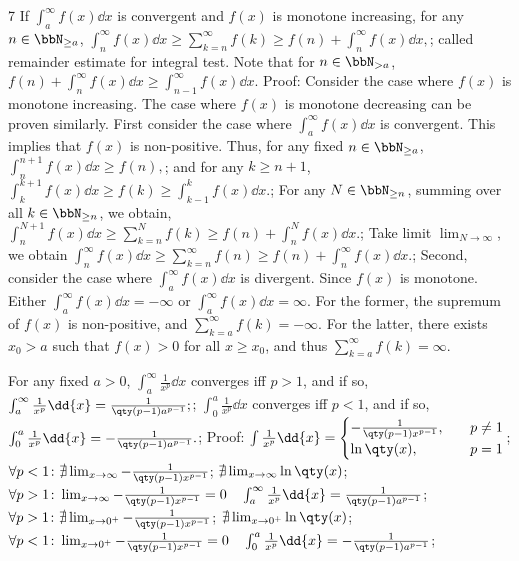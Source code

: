 \documentclass[a4paper,10pt]{extarticle}
\begin{document}
\begin{multicols}{7}
If $\int_a^{\infty}f(x)\dd{x}$ is convergent and $f(x)$ is monotone increasing, for any $n\in\bbN_{\ge a}$,
\(\int_n^{\infty}f(x)\dd{x}\ge\sum_{k=n}^{\infty}f(k)\ge f(n)+\int_n^{\infty}f(x)\dd{x},\); 
called remainder estimate for integral test. Note that for $n\in\bbN_{>a}$, $f(n)+\int_n^{\infty}f(x)\dd{x}\ge\int_{n-1}^{\infty}f(x)\dd{x}$.
Proof:
Consider the case where $f(x)$ is monotone increasing. The case where $f(x)$ is monotone decreasing can be proven similarly. First consider the case where $\int_a^{\infty}f(x)\dd{x}$ is convergent. This implies that $f(x)$ is non-positive. Thus, for any fixed $n\in\bbN_{\ge a}$,
\(\int_n^{n+1}f(x)\dd{x}\ge f(n),\); 
and for any $k\geq n+1$,
\(\int_k^{k+1}f(x)\dd{x}\ge f(k)\ge\int_{k-1}^kf(x)\dd{x}.\); 
For any $N\in\bbN_{\ge n}$, summing over all $k\in\bbN_{\ge n}$, we obtain, 
\(\int_n^{N+1}f(x)\dd{x}\ge\sum_{k=n}^Nf(k)\ge f(n)+\int_n^Nf(x)\dd{x}.\); 
Take limit $\lim_{N\to\infty}$, we obtain
\(\int_n^{\infty}f(x)\dd{x}\ge\sum_{k=n}^{\infty}f(n)\ge f(n)+\int_n^{\infty}f(x)\dd{x}.\); 
Second, consider the case where $\int_a^{\infty}f(x)\dd{x}$ is divergent. Since $f(x)$ is monotone. Either $\int_a^{\infty}f(x)\dd{x}=-\infty$ or $\int_a^{\infty}f(x)\dd{x}=\infty$. For the former, the supremum of $f(x)$ is non-positive, and $\sum_{k=a}^{\infty}f(k)=-\infty$. For the latter, there exists $x_0>a$ such that $f(x)>0$ for all $x\ge x_0$, and thus $\sum_{k=a}^{\infty}f(k)=\infty$.



For any fixed $a>0$, $\int_a^{\infty}\frac{1}{x^p}\dd{x}$ converges iff $p>1$, and if so,
\(\int_a^{\infty}\frac{1}{x^p}\dd{x}=\frac{1}{\qty(p-1)a^{p-1}};\); 
$\int_0^a\frac{1}{x^p}\dd{x}$ converges iff $p<1$, and if so,
\(\int_0^a\frac{1}{x^p}\dd{x}=-\frac{1}{\qty(p-1)a^{p-1}}.\); 
Proof:
\(\int\frac{1}{x^p}\dd{x}=\begin{cases}
-\frac{1}{\qty(p-1)x^{p-1}},\quad&p\neq 1\\
\ln\qty(x),\quad&p=1
\end{cases}\); 
\(\forall p<1\colon\nexists\lim_{x\to\infty}-\frac{1}{\qty(p-1)x^{p-1}}\); 
\(\nexists\lim_{x\to\infty}\ln\qty(x)\); 
\(\forall p>1\colon\lim_{x\to\infty}-\frac{1}{\qty(p-1)x^{p-1}}=0\quad\int_a^{\infty}\frac{1}{x^p}\dd{x}=\frac{1}{\qty(p-1)a^{p-1}}\); 
\(\forall p>1\colon\nexists\lim_{x\to 0^+}-\frac{1}{\qty(p-1)x^{p-1}}\); 
\(\nexists\lim_{x\to 0^+}\ln\qty(x)\); 
\(\forall p<1\colon\lim_{x\to 0^+}-\frac{1}{\qty(p-1)x^{p-1}}=0\quad\int_0^a\frac{1}{x^p}\dd{x}=-\frac{1}{\qty(p-1)a^{p-1}}\); 


\end{multicols}
\end{document}
